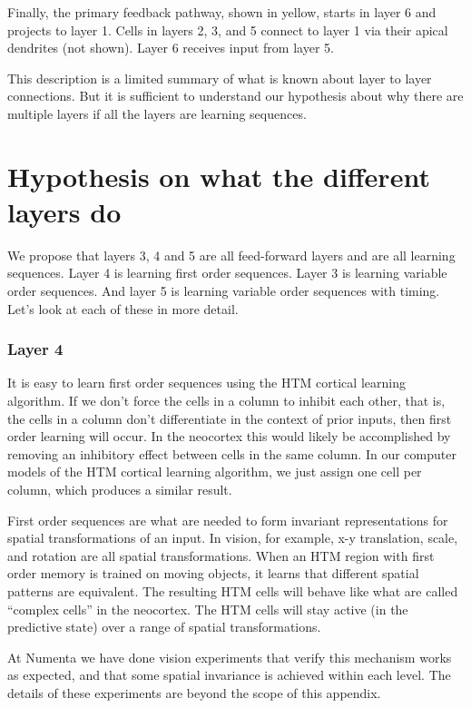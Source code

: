 \documentclass{report}
\begin{document}
Finally, the primary feedback pathway, shown in yellow, starts in
layer 6 and projects to layer 1. Cells in layers 2, 3, and 5 connect
to layer 1 via their apical dendrites (not shown). Layer 6 receives
input from layer 5.

This description is a limited summary of what is known about layer to
layer connections. But it is sufficient to understand our hypothesis
about why there are multiple layers if all the layers are learning
sequences.

\section*{Hypothesis on what the different layers do}

We propose that layers 3, 4 and 5 are all feed-forward layers and are
all learning sequences. Layer 4 is learning first order
sequences. Layer 3 is learning variable order sequences. And layer 5
is learning variable order sequences with timing. Let's look at each
of these in more detail.

\subsubsection*{Layer 4}
It is easy to learn first order sequences using the HTM cortical
learning algorithm. If we don't force the cells in a column to inhibit
each other, that is, the cells in a column don't differentiate in the
context of prior inputs, then first order learning will occur. In the
neocortex this would likely be accomplished by removing an inhibitory
effect between cells in the same column. In our computer models of the
HTM cortical learning algorithm, we just assign one cell per column,
which produces a similar result.

First order sequences are what are needed to form invariant
representations for spatial transformations of an input. In vision,
for example, x-y translation, scale, and rotation are all spatial
transformations. When an HTM region with first order memory is trained
on moving objects, it learns that different spatial patterns are
equivalent. The resulting HTM cells will behave like what are called
``complex cells'' in the neocortex. The HTM cells will stay active (in
the predictive state) over a range of spatial transformations.

At Numenta we have done vision experiments that verify this mechanism
works as expected, and that some spatial invariance is achieved within
each level. The details of these experiments are beyond the scope of
this appendix.
\end{document}
